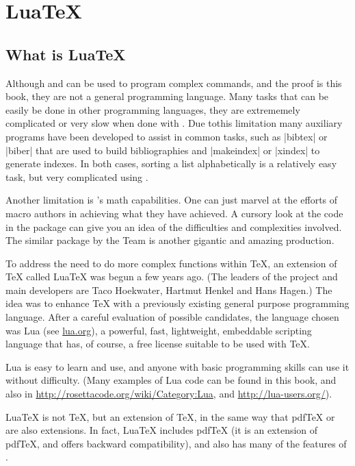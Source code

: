 \chapter{LuaTeX}

\section{What is LuaTeX}

Although \tex and \latex can be used to program complex commands, and the proof is this book, they are not a general programming language. Many tasks that can be easily be done
in other programming languages, they are extrememely complicated or very slow when done with \tex. Due tothis limitation many auxiliary programs have been developed to assist in common tasks, such as |bibtex| or |biber| that are used to build bibliographies and |makeindex| or |xindex| to generate indexes. In both cases, sorting a list alphabetically is a relatively easy task, but very complicated using \tex.


Another limitation is \tex's math capabilities. One can just marvel at the efforts of \tex macro authors in achieving what they have achieved. A cursory look at the code in the  package \cite{fp} can give you an idea of the difficulties and complexities involved. The similar package by the  Team is another gigantic and amazing production.

To address the need to do more complex functions within \TeX, an extension of \TeX{} called Lua\TeX{} was begun a few years ago.  
(The leaders of the project and main developers are Taco Hoekwater, Hartmut Henkel and Hans Hagen.) The idea was to enhance \TeX{} with a previously existing general purpose programming language. After a careful evaluation of possible candidates, the language chosen was Lua (see \href{http://www.lua.org/}{lua.org}), a powerful, fast, lightweight, embeddable scripting language that has,  of course, a free license suitable to be used with \TeX.

Lua is easy to learn and use, and anyone with basic programming skills can use it without difficulty. (Many examples of Lua code can be found in this book, and also in \url{http://rosettacode.org/wiki/Category:Lua},
and \url{http://lua-users.org/}).

Lua\TeX{} is not \TeX{}, but an extension of \TeX{}, in the same way that pdf\TeX{} or \XeTeX{} are also extensions.
In fact, Lua\TeX{} includes pdf\TeX{} (it is an extension of pdf\TeX{}, and offers backward compatibility), 
and also has many of the features of \XeTeX.

